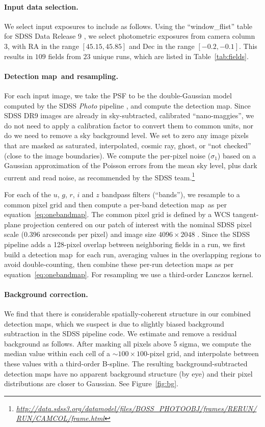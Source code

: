 \documentclass[letterpaper,preprint]{aastex62}
\newcommand{\equationname}{equation}
\newcommand{\eqnref}[1]{\mbox{\equationname~\ref{#1}}}
\newcommand{\tabref}[1]{\mbox{Table~\ref{#1}}}
\newcommand{\niceurl}[1]{\mbox{\href{#1}{\textsl{#1}}}}
\newcommand{\figref}[1]{\mbox{Figure~\ref{#1}}}
\newcommand{\detmap}{detection map}
\newcommand{\Detmap}{Detection map}
\begin{document}
\paragraph{Input data selection.}
We select input exposures to include as follows.  Using the
``window\_flist'' table for SDSS Data Release 9 \cite{dr9}, we select
photometric exposures from camera column 3, with RA in the range
$[45.15, 45.85]$ and Dec in the range $[-0.2, -0.1]$.  This results in
$109$ fields from $23$ unique runs, which are listed in
\tabref{tab:fields}.

\paragraph{\Detmap\ and resampling.}
For each input image, we take the PSF to be the double-Gaussian model
computed by the SDSS \emph{Photo} pipeline \cite{photo}, and compute
the \detmap.  Since SDSS DR9 images are already in sky-subtracted,
calibrated ``nano-maggies'', we do not need to apply a calibration
factor to convert them to common units, nor do we need to remove a sky
background level.  We set to zero any image pixels that are masked as
saturated, interpolated, cosmic ray, ghost, or ``not checked'' (close
to the image boundaries).
We compute the per-pixel noise ($\sigma_1$) based on a Gaussian
approximation of the Poisson errors from the mean sky level, plus dark
current and read noise, as recommended by the SDSS
team.\footnote{\niceurl{http://data.sdss3.org/datamodel/files/BOSS\_PHOTOOBJ/frames/RERUN/RUN/CAMCOL/frame.html}}


For each of the $u$, $g$, $r$, $i$ and $z$ bandpass filters
(``bands''), we resample to a common pixel grid and then compute a
per-band \detmap\ as per \eqnref{eq:onebandmap}.  The common pixel
grid is defined by a WCS tangent-plane projection centered on our
patch of interest with the nominal SDSS pixel scale (0.396 arcseconds
per pixel) and image size $4096 \times 2048$ \cite{wcs}.  Since the
SDSS pipeline adds a 128-pixel overlap between neighboring fields in a
run, we first build a \detmap\ for each run, averaging values in the
overlapping regions to avoid double-counting, then combine these
per-run \detmap s as per \eqnref{eq:onebandmap}.  For resampling we
use a third-order Lanczos kernel.


\paragraph{Background correction.}
We find that there is considerable spatially-coherent structure in our
combined \detmap s, which we suspect is due to slightly biased
background subtraction in the SDSS pipeline code.  We estimate and
remove a residual background as follows.  After masking all pixels
above 5 sigma, we compute the median value within each cell of a $\sim
100 \times 100$-pixel grid, and interpolate between these values with
a third-order B-spline.  The resulting background-subtracted \detmap s
have no apparent background structure (by eye) and their pixel
distributions are closer to Gaussian.  See \figref{fig:bg}.
\end{document}
